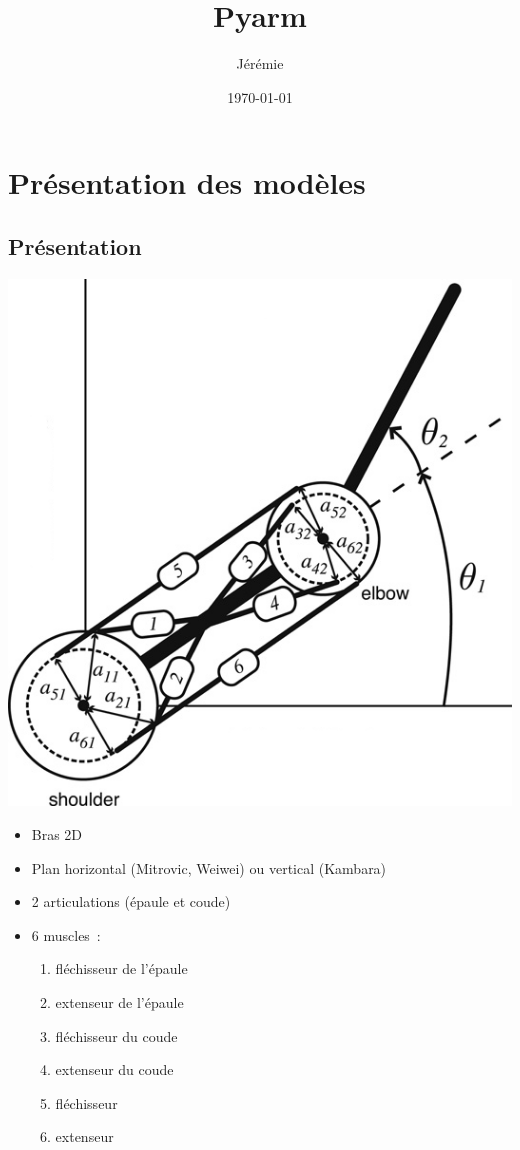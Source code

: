 \documentclass[pdftex,a4paper,11pt]{article}
\begin{document}
\title{Pyarm}
\author{
	Jérémie 
}
\date{\today{}}

\maketitle


\section{Présentation des modèles}

\subsection{Présentation}

\begin{center}
        \includegraphics[width=.40\linewidth]{fig/arm}
\end{center}

\begin{itemize}
    \item Bras 2D
    \item Plan horizontal (Mitrovic, Weiwei) ou vertical (Kambara)
    \item 2 articulations (épaule et coude)
    \item 6 muscles~:
    \begin{enumerate}
        \item fléchisseur de l'épaule
        \item extenseur de l'épaule
        \item fléchisseur du coude
        \item extenseur du coude
        \item fléchisseur
        \item extenseur
    \end{enumerate}
\end{itemize}
\end{document}

